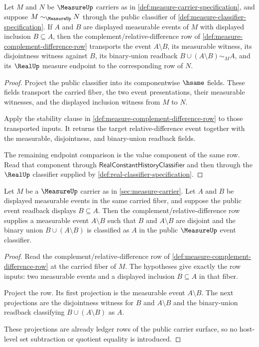 \begin{theorem}
\label{thm:measure-complement-row-transport}
Let $M$ and $N$ be $\MeasureUp$ carriers as in
\autoref{def:measure-carrier-specification}, and suppose
$M\sim_{\MeasureUp}N$ through the public classifier of
\autoref{def:measure-classifier-specification}. If $A$ and $B$ are displayed
measurable events of $M$ with displayed inclusion $B\subseteq A$, then the
complement/relative-difference row of
\autoref{def:measure-complement-difference-row} transports the event
$A\setminus B$, its measurable witness, its disjointness witness against $B$,
its binary-union readback $B\cup(A\setminus B)\sim_M A$, and its $\RealUp$
measure endpoint to the corresponding row of $N$.
\end{theorem}
\begin{proof}
Project the public classifier into its componentwise $\hsame$ fields. These
fields transport the carried fiber, the two event presentations, their
measurable witnesses, and the displayed inclusion witness from $M$ to $N$.

Apply the stability clause in
\autoref{def:measure-complement-difference-row} to those transported inputs.
It returns the target relative-difference event together with the measurable,
disjointness, and binary-union readback fields.

The remaining endpoint comparison is the value component of the same row. Read
that component through $\mathsf{RealConstantHistoryClassifier}$ and then
through the $\RealUp$ classifier supplied by
\autoref{def:real-classifier-specification}.
\end{proof}

\begin{theorem}
\label{thm:measure-relative-difference-disjoint-decomposition}
Let $M$ be a $\MeasureUp$ carrier as in \autoref{sec:measure-carrier}. Let
$A$ and $B$ be displayed measurable events in the same carried fiber, and
suppose the public event readback displays $B\subseteq A$. Then the
complement/relative-difference row supplies a measurable event
$A\setminus B$ such that $B$ and $A\setminus B$ are disjoint and the binary
union $B\cup(A\setminus B)$ is classified as $A$ in the public $\MeasureUp$
event classifier.
\end{theorem}
\begin{proof}
Read the complement/relative-difference row of
\autoref{def:measure-complement-difference-row} at the carried fiber of $M$.
The hypotheses give exactly the row inputs: two measurable events and a
displayed inclusion $B\subseteq A$ in that fiber.

Project the row. Its first projection is the measurable event
$A\setminus B$. The next projections are the disjointness witness for $B$ and
$A\setminus B$ and the binary-union readback classifying
$B\cup(A\setminus B)$ as $A$.

These projections are already ledger rows of the public carrier surface, so no
host-level set subtraction or quotient equality is introduced.
\end{proof}

